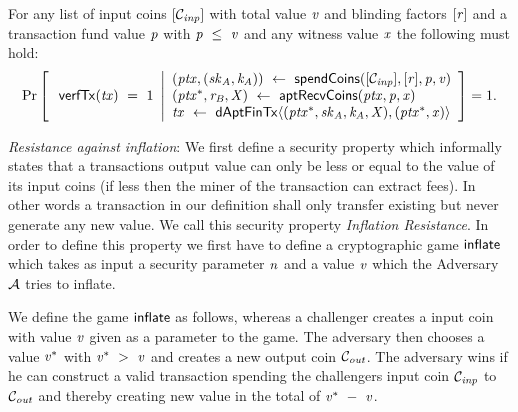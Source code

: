 \begin{definition}
    \label{def:apt-tx-scheme-correctness}
    For any list of input coins $[\mathcal{C}_{\mathit{inp}}]$ with total value $\mathit{v}$ and blinding factors
    $[\mathit{r}]$ and a transaction fund value $\mathit{p}$ with $\mathit{p} ~\leq~ \mathit{v}$ and any witness value $\mathit{x}$ the following must hold:
    \[
        \Pr\left[
        \begin{array}{c}
            \: \mathsf{verfTx}(\mathit{tx}) ~=~ 1
        \end{array}
        \middle\vert
        \begin{array}{l}
            (\mathit{ptx}, (\mathit{sk}_{\mathit{A}}, \mathit{\mathit{k}_{\mathit{A}}})) ~\leftarrow~ \mathsf{spendCoins}([\mathcal{C}_{\mathit{inp}}],[\mathit{r}],\mathit{p},\mathit{v}) \\
            (\mathit{ptx}^*, \mathit{r}_{\mathit{B}}, \mathit{X}) ~\leftarrow~ \mathsf{aptRecvCoins}(\mathit{ptx},\mathit{p},\mathit{x}) \\
            \mathit{tx} ~\leftarrow~ \mathsf{dAptFinTx} \langle (\mathit{ptx}^*,\mathit{sk}_{\mathit{A}},\mathit{\mathit{k}_{\mathit{A}}},\mathit{X}), (\mathit{ptx}^*,\mathit{x}) \rangle
        \end{array}
        \right]=1.
    \]
\end{definition}

\emph{Resistance against inflation}: We first define a security property which informally states that a transactions output value can only be less or equal to the value of its input coins (if less then the miner of the transaction can extract fees).
In other words a transaction in our definition shall only transfer existing but never generate any new value. We call this security property \emph{Inflation Resistance}.
In order to define this property we first have to define a cryptographic game $\mathsf{inflate}$ which takes as input a security parameter $\mathit{n}$ and a value $\mathit{v}$ which the Adversary
$\mathcal{A}$ tries to inflate.

We define the game $\mathsf{inflate}$ as follows, whereas a challenger creates a input coin with value $\mathit{v}$ given as a parameter to the game. The adversary then chooses a value $\mathit{v}^*$ with
$\mathit{v}^* ~>~ \mathit{v}$ and creates a new output coin $\mathcal{C}_{\mathit{out}}$. The adversary wins if he can construct a valid transaction spending the challengers input coin $\mathcal{C}_{\mathit{inp}}$ to $\mathcal{C}_{\mathit{out}}$ and thereby
creating new value in the total of $\mathit{v}^* ~-~ \mathit{v}$.

